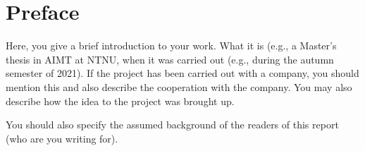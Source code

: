\hypersetup{pageanchor=false}
%

\chapter*{Preface}

Here, you give a brief introduction to your work. What it is (e.g., a Master's thesis in AIMT at NTNU, when it was carried out (e.g., during the autumn semester of 2021). If the project has been carried out with a company, you should mention this and also describe the cooperation with the company. You may also describe how the idea to the project was brought up.

You should also specify the assumed background of the readers of this report (who are you writing for).\\[2cm]

\thesisdate \\[1pc]
\\[1pc]
